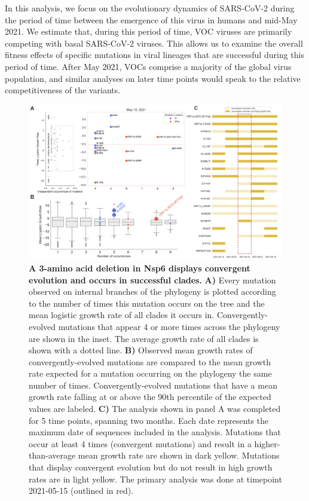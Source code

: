 \documentclass[11pt,oneside,letterpaper]{article}
\begin{document}
In this analysis, we focus on the evolutionary dynamics of SARS-CoV-2 during the period of time between the emergence of this virus in humans and mid-May 2021.
We estimate that, during this period of time, VOC viruses are primarily competing with basal SARS-CoV-2 viruses.
This allows us to examine the overall fitness effects of specific mutations in viral lineages that are successful during this period of time.
After May 2021, VOCs comprise a majority of the global virus population, and similar analyses on later time points would speak to the relative competitiveness of the variants.

\begin{figure}[h!]
	\centerline{\includegraphics[width=1.0\textwidth]{fig4_convergent.png}}
	\caption{\textbf{A 3-amino acid deletion in Nsp6 displays convergent evolution and occurs in successful clades.}
	\textbf{A)} Every mutation observed on internal branches of the phylogeny is plotted according to the number of times this mutation occurs on the tree and the mean logistic growth rate of all clades it occurs in.
	Convergently-evolved mutations that appear 4 or more times across the phylogeny are shown in the inset. The average growth rate of all clades is shown with a dotted line.
	\textbf{B)} Observed mean growth rates of convergently-evolved mutations are compared to the mean growth rate expected for a mutation occurring on the phylogeny the same number of times. Convergently-evolved mutations that have a mean growth rate falling at or above the 90th percentile of the expected values are labeled.
	\textbf{C)} The analysis shown in panel A was completed for 5 time points, spanning two months. Each date represents the maximum date of sequences included in the analysis.
	Mutations that occur at least 4 times (convergent mutations) and result in a higher-than-average mean growth rate are shown in dark yellow.
	Mutations that display convergent evolution but do not result in high growth rates are in light yellow.
	The primary analysis was done at timepoint 2021-05-15 (outlined in red).
	}
	\label{fig:convergent}
\end{figure}
\end{document}
